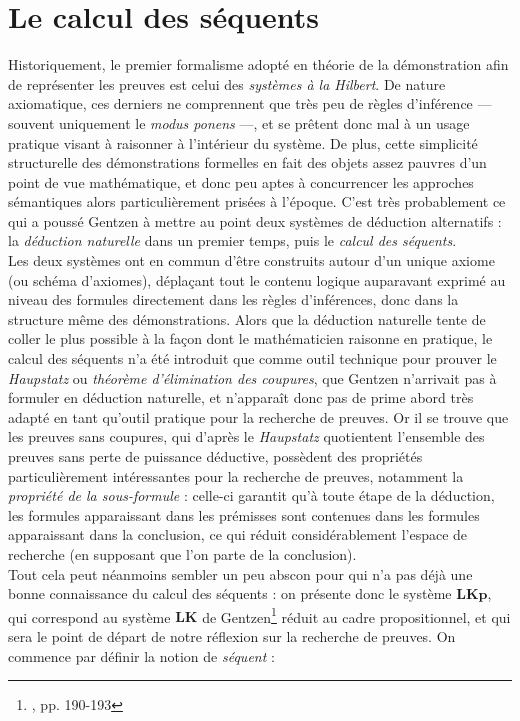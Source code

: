 \documentclass[12pt]{report}
\begin{document}
\chapter*{Le calcul des séquents}

Historiquement, le premier formalisme adopté en théorie de la démonstration afin de représenter les preuves est celui des \emph{systèmes à la Hilbert}. De nature axiomatique, ces derniers ne comprennent que très peu de règles d'inférence --- souvent uniquement le \textit{modus ponens} ---, et se prêtent donc mal à un usage pratique visant à raisonner à l'intérieur du système. De plus, cette simplicité structurelle des démonstrations formelles en fait des objets assez pauvres d'un point de vue mathématique, et donc peu aptes à concurrencer les approches sémantiques alors particulièrement prisées à l'époque. C'est très probablement ce qui a poussé Gentzen à mettre au point deux systèmes de déduction alternatifs : la \emph{déduction naturelle} dans un premier temps, puis le \emph{calcul des séquents}.\\

Les deux systèmes ont en commun d'être construits autour d'un unique axiome (ou schéma d'axiomes), déplaçant tout le contenu logique auparavant exprimé au niveau des formules directement dans les règles d'inférences, donc dans la structure même des démonstrations. Alors que la déduction naturelle tente de coller le plus possible à la façon dont le mathématicien raisonne en pratique, le calcul des séquents n'a été introduit que comme outil technique pour prouver le \textit{Haupstatz} ou \emph{théorème d'élimination des coupures}, que Gentzen n'arrivait pas à formuler en déduction naturelle, et n'apparaît donc pas de prime abord très adapté en tant qu'outil pratique pour la recherche de preuves. Or il se trouve que les preuves sans coupures, qui d'après le \textit{Haupstatz} quotientent l'ensemble des preuves sans perte de puissance déductive, possèdent des propriétés particulièrement intéressantes pour la recherche de preuves, notamment la \emph{propriété de la sous-formule} : celle-ci garantit qu'à toute étape de la déduction, les formules apparaissant dans les prémisses sont contenues dans les formules apparaissant dans la conclusion, ce qui réduit considérablement l'espace de recherche (en supposant que l'on parte de la conclusion).\\

Tout cela peut néanmoins sembler un peu abscon pour qui n'a pas déjà une bonne connaissance du calcul des séquents : on présente donc le système $\mathbf{LKp}$, qui correspond au système $\mathbf{LK}$ de Gentzen\footnote{\cite{Gen35}, pp. 190-193} réduit au cadre propositionnel, et qui sera le point de départ de notre réflexion sur la recherche de preuves. On commence par définir la notion de \emph{séquent} :
\end{document}
